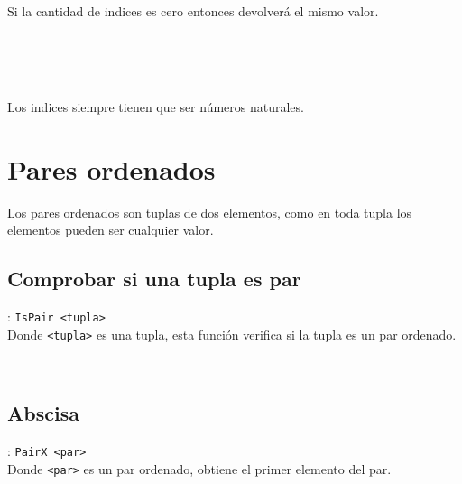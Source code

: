       \begin{fxcode}
         \\
      \end{fxcode}
      
      Si la cantidad de indices es cero entonces devolverá el mismo valor.
      
      \begin{fxcode}
         \\
         \\
         \\
      \end{fxcode}
      
      Los indices siempre tienen que ser números naturales.
      
   \section{Pares ordenados}
      Los pares ordenados son tuplas de dos elementos, como en toda tupla los elementos pueden ser cualquier valor.
      
      \subsection*{Comprobar si una tupla es par}: \texttt{IsPair <tupla>}\\
      Donde \texttt{<tupla>} es una tupla, esta función verifica si la tupla es un par ordenado.
      
      \begin{fxcode}
         \\
      \end{fxcode}
      
      \subsection*{Abscisa}: \texttt{PairX <par>}\\
      Donde \texttt{<par>} es un par ordenado, obtiene el primer elemento del par.
      
      \begin{fxcode}
         \\
      \end{fxcode}
      
